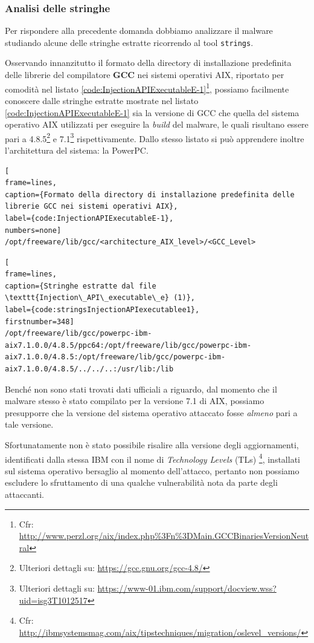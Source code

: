 \documentclass[10pt,a4paper, titlepage]{report}
\begin{document}
\subsubsection{Analisi delle stringhe}\label{subsection:InjectionAPIExecutableE}

Per rispondere alla precedente domanda dobbiamo analizzare il malware studiando alcune delle stringhe estratte ricorrendo al tool \texttt{strings}.

Osservando innanzitutto il formato della directory di installazione predefinita delle librerie del compilatore \textbf{GCC} nei sistemi operativi AIX, riportato per comodità nel listato \ref{code:InjectionAPIExecutableE-1}\footnote{Cfr: \url{http://www.perzl.org/aix/index.php\%3Fn\%3DMain.GCCBinariesVersionNeutral}}, possiamo facilmente conoscere dalle stringhe estratte mostrate nel listato \ref{code:InjectionAPIExecutableE-1} sia la versione di GCC che quella del sistema operativo AIX utilizzati per eseguire la \textit{build} del malware, le quali risultano essere pari a 4.8.5\footnote{Ulteriori dettagli su: \url{https://gcc.gnu.org/gcc-4.8/}} e 7.1\footnote{Ulteriori dettagli su: \url{https://www-01.ibm.com/support/docview.wss?uid=isg3T1012517}} rispettivamente. Dallo stesso listato si può apprendere inoltre l'architettura del sistema: la PowerPC\texttrademark.

\begin{lstlisting}[
frame=lines, 
caption={Formato della directory di installazione predefinita delle librerie GCC nei sistemi operativi AIX}, 
label={code:InjectionAPIExecutableE-1},
numbers=none]
/opt/freeware/lib/gcc/<architecture_AIX_level>/<GCC_Level>
\end{lstlisting}

\begin{lstlisting}[
frame=lines, 
caption={Stringhe estratte dal file \texttt{Injection\_API\_executable\_e} (1)}, 
label={code:stringsInjectionAPIexecutablee1},
firstnumber=348]
/opt/freeware/lib/gcc/powerpc-ibm-aix7.1.0.0/4.8.5/ppc64:/opt/freeware/lib/gcc/powerpc-ibm-aix7.1.0.0/4.8.5:/opt/freeware/lib/gcc/powerpc-ibm-aix7.1.0.0/4.8.5/../../..:/usr/lib:/lib
\end{lstlisting}

Benché non sono stati trovati dati ufficiali a riguardo, dal momento che il malware stesso è stato compilato per la versione 7.1 di AIX, possiamo presupporre che la versione del sistema operativo attaccato fosse \textit{almeno} pari a tale versione. 

Sfortunatamente non è stato possibile risalire alla versione degli aggiornamenti, identificati dalla stessa IBM con il nome di \textit{Technology Levels} (TLs) \footnote{Cfr: \url{http://ibmsystemsmag.com/aix/tipstechniques/migration/oslevel\_versions/}}, installati sul sistema operativo bersaglio al momento dell'attacco, pertanto non possiamo escludere lo sfruttamento di una qualche vulnerabilità nota da parte degli attaccanti.
\end{document}
